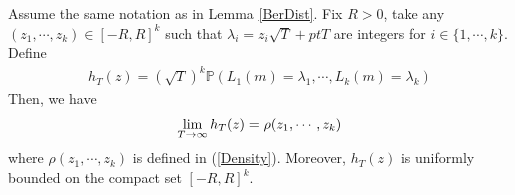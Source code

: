 \begin{corollary}{\label{BerDistLim}}
	Assume the same notation as in Lemma \ref{BerDist}. Fix $R>0$, take any $(z_1,\cdots,z_k)\in[-R,R]^k$ such that $\lambda_{i}=z_i\sqrt{T}+ptT$ are integers for $i\in\{1,\cdots,k\}$. Define
	\begin{equation*}
		\begin{split}
			h_{T}(z)=(\sqrt{T})^k\mathbb{P}(L_{1}(m)=\lambda_1,\cdots,L_k(m)=\lambda_k)
		\end{split}
	\end{equation*}
	Then, we have
	\begin{equation}{\label{hT}}
		\begin{split}
			\lim_{T\rightarrow\infty}h_{T}(z)=\rho(z_1,\cdots,z_k)
		\end{split}
	\end{equation}
	where $\rho(z_1,\cdots,z_k)$ is defined in (\ref{Density}). Moreover, $h_{T}(z)$ is uniformly bounded on the compact set $[-R,R]^{k}$. 
\end{corollary}
